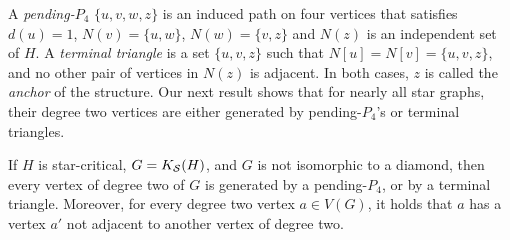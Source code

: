 A \textit{pending-$P_4$} $\{u, v, w, z\}$ is an induced path on four vertices that satisfies $d(u) = 1$, $N(v) = \{u, w\}$, $N(w) = \{v, z\}$ and $N(z)$ is an independent set of $H$.
A \textit{terminal triangle} is a set $\{u, v, z\}$ such that $N[u] = N[v] = \{u,v,z\}$, and no other pair of vertices in $N(z)$ is adjacent.
In both cases, $z$ is called the \textit{anchor} of the structure.
Our next result shows that for nearly all star graphs, their degree two vertices are either generated by pending-$P_4$'s or terminal triangles.

\begin{lemma}
    If $H$ is star-critical, $G = K_{\mathcal{S}}(H)$, and $G$ is not isomorphic to a diamond, then every vertex of degree two of $G$ is generated by a pending-$P_4$,
    or by a terminal triangle.
    Moreover, for every degree two vertex $a \in V(G)$, it holds that $a$ has a vertex $a'$ not adjacent to another vertex of degree two.
\end{lemma}

